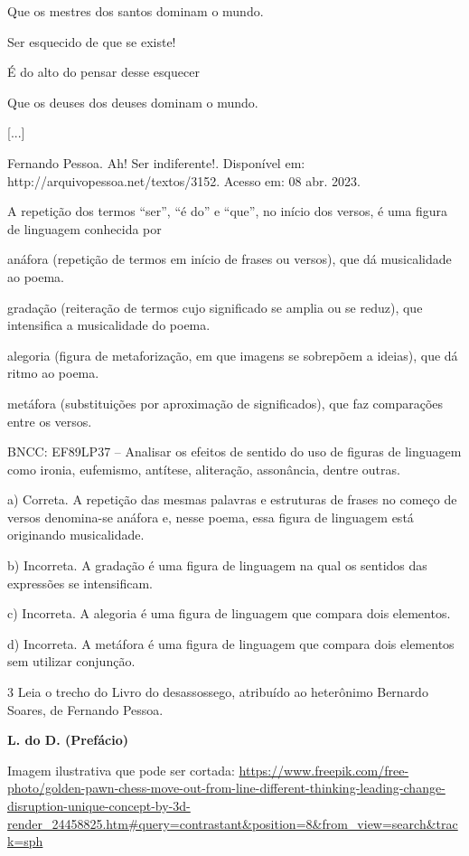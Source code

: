 {Que os mestres dos santos dominam o mundo.

Ser esquecido de que se existe!

É do alto do pensar desse esquecer

Que os deuses dos deuses dominam o mundo.

{[}...{]}

Fernando Pessoa. Ah! Ser indiferente!. Disponível em:
http://arquivopessoa.net/textos/3152. Acesso em: 08 abr. 2023.

A repetição dos termos ``ser'', ``é do'' e ``que'', no início dos
versos, é uma figura de linguagem conhecida por

\begin{escolha}
\item anáfora (repetição de termos em início de frases ou versos), que dá
musicalidade ao poema.

\item gradação (reiteração de termos cujo significado se amplia ou se
reduz), que intensifica a musicalidade do poema.

\item alegoria (figura de metaforização, em que imagens se sobrepõem a
ideias), que dá ritmo ao poema.

\item metáfora (substituições por aproximação de significados), que faz
comparações entre os versos.
\end{escolha}

BNCC: EF89LP37 -- Analisar os efeitos de sentido do uso de figuras de
linguagem como ironia, eufemismo, antítese, aliteração, assonância,
dentre outras.

a) Correta. A repetição das mesmas palavras e estruturas de frases no
começo de versos denomina-se anáfora e, nesse poema, essa figura de
linguagem está originando musicalidade.

b) Incorreta. A gradação é uma figura de linguagem na qual os sentidos
das expressões se intensificam.

c) Incorreta. A alegoria é uma figura de linguagem que compara dois
elementos.

d) Incorreta. A metáfora é uma figura de linguagem que compara dois
elementos sem utilizar conjunção.

\num{3} Leia o trecho do Livro do desassossego, atribuído ao heterônimo
Bernardo Soares, de Fernando Pessoa.

\textbf{L. do D. (Prefácio)}

Imagem ilustrativa que pode ser cortada:
\url{https://www.freepik.com/free-photo/golden-pawn-chess-move-out-from-line-different-thinking-leading-change-disruption-unique-concept-by-3d-render_24458825.htm\#query=contrastant\&position=8\&from_view=search\&track=sph}

}
